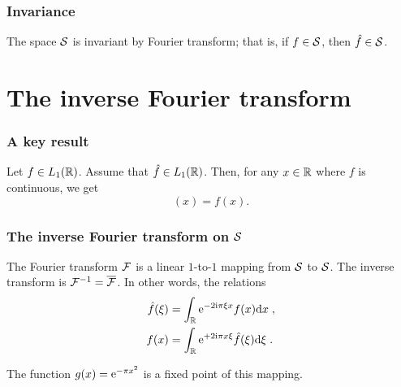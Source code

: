 \begin{frame}
\frametitle{Invariance}
\begin{theorem}
The space $\mathcal{S}$ is invariant by Fourier transform; that is, if $f \in \mathcal{S}$, then $\hat{f} \in \mathcal{S}$.
\end{theorem}
\end{frame}

\section{The inverse Fourier transform}
\begin{frame}
\frametitle{A key result}
\begin{theorem}\label{prop:inversionFourierL1}
Let $f\in L_1(\mathbb{R})$. Assume that $\hat{f} \in L_1(\mathbb{R})$. Then, for any $x \in \mathbb{R}$ where $f$ is continuous, we get
\begin{equation*}
[\bar{\TF} \hat{f}](x) = f(x).
\end{equation*}
\end{theorem}
\end{frame}

\begin{frame}
\frametitle{The inverse Fourier transform on $\mathcal{S}$}
\begin{theorem}\label{thm:Schwartz}
The Fourier transform $\mathcal{F}$ is a linear $1$-to-$1$ mapping from $\mathcal{S}$ to $\mathcal{S}$.
The inverse transform is $\mathcal{F}^{-1} = \overline{\mathcal{F}}$. In other words, the relations
\begin{align*}
\hat{f}(\xi) &= \int_{\mathbb{R}} \mathrm{e}^{-2 \mathrm{i} \pi \xi x} f(x) \mathrm{d} x \;, \\
f(x) &= \int_{\mathbb{R}} \mathrm{e}^{+ 2 \mathrm{i} \pi x \xi} \hat{f}(\xi) \mathrm{d} \xi \;. 
\end{align*}
\end{theorem}
The function $g(x) = \mathrm{e}^{- \pi x^2}$ is a fixed point of this mapping.
\end{frame}

